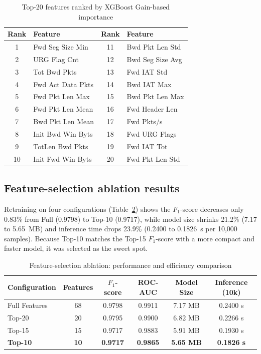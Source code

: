 \documentclass{iaesarticle}
\begin{document}
\begin{table}[H]
\centering
\fontsize{8pt}{10pt}\selectfont
\caption{Top-20 features ranked by XGBoost Gain-based importance}
\label{tab:feature_importance}
\begin{tabular}{c l c l}
\hline
\textbf{Rank} & \textbf{Feature} & \textbf{Rank} & \textbf{Feature} \\ \hline
1  & Fwd Seg Size Min   & 11 & Bwd Pkt Len Std \\
2  & URG Flag Cnt       & 12 & Bwd Seg Size Avg \\
3  & Tot Bwd Pkts       & 13 & Fwd IAT Std \\
4  & Fwd Act Data Pkts  & 14 & Bwd IAT Max \\
5  & Fwd Pkt Len Max    & 15 & Bwd Pkt Len Max \\
6  & Fwd Pkt Len Mean   & 16 & Fwd Header Len \\
7  & Bwd Pkt Len Mean   & 17 & Fwd Pkts/s \\
8  & Init Bwd Win Byts  & 18 & Fwd URG Flags \\
9  & TotLen Bwd Pkts    & 19 & Fwd IAT Tot \\
10 & Init Fwd Win Byts  & 20 & Fwd Pkt Len Std \\ \hline
\end{tabular}
\end{table}

\subsection{Feature-selection ablation results}
Retraining on four configurations (Table~\ref{tab:ablation_selection}) shows the $F_1$-score decreases only 0.83\% from Full (0.9798) to Top-10 (0.9717), while model size shrinks 21.2\% (7.17 to 5.65~MB) and inference time drops 23.9\% (0.2400 to 0.1826~s per 10{,}000 samples). Because Top-10 matches the Top-15 $F_1$-score with a more compact and faster model, it was selected as the sweet spot.

\begin{table}[H]
\centering
\fontsize{8pt}{10pt}\selectfont
\caption{Feature-selection ablation: performance and efficiency comparison}
\label{tab:ablation_selection}
\begin{tabular}{l c c c c c}
\hline
\textbf{Configuration} & \textbf{Features} & \textbf{$F_1$-score} & \textbf{ROC-AUC} & \textbf{Model Size} & \textbf{Inference (10k)} \\ \hline
Full Features & 68 & 0.9798 & 0.9911 & 7.17 MB & 0.2400 s \\
Top-20        & 20 & 0.9795 & 0.9900 & 6.82 MB & 0.2266 s \\
Top-15        & 15 & 0.9717 & 0.9883 & 5.91 MB & 0.1930 s \\
\textbf{Top-10} & \textbf{10} & \textbf{0.9717} & \textbf{0.9865} & \textbf{5.65 MB} & \textbf{0.1826 s} \\ \hline
\end{tabular}
\end{table}
\end{document}

